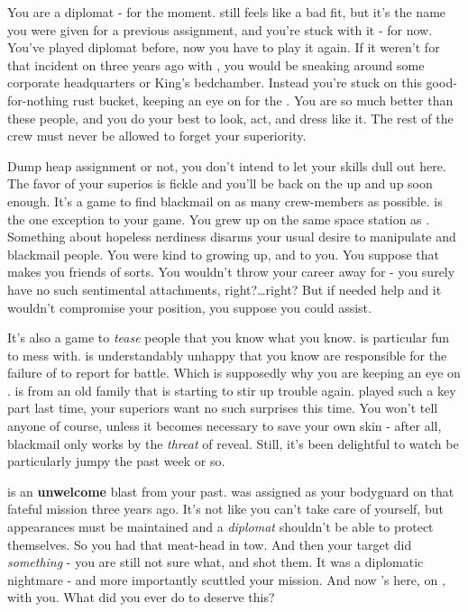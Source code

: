 \documentclass[char]{TMFHope}
\begin{document}
\name{\cDip{}}

You are a diplomat - for the moment. \cDip{} still feels like a bad fit, but it's the name you were given for a previous assignment, and you're stuck with it - for now. You've played diplomat before, now you have to play it again. If it weren't for that incident on \pHome{} three years ago with \cWeap{}, you would be sneaking around some corporate headquarters or King's bedchamber. Instead you're stuck on this good-for-nothing rust bucket, keeping an eye on \cXO{} for the \pPlan{}. You are so much better than these people, and you do your best to look, act, and dress like it. The rest of the crew must never be allowed to forget your superiority.

Dump heap assignment or not, you don't intend to let your skills dull out here. The favor of your superios is fickle and you'll be back on the up and up soon enough. It's a game to find blackmail on as many crew-members as possible. \cMed{} is the one exception to your game. You grew up on the same space station as \cMed{\them}. Something about  hopeless nerdiness disarms your usual desire to manipulate and blackmail people. You were kind to \cMed{\them} growing up, and \cMed{\they} to you. You suppose that makes you friends of sorts. You wouldn't throw your career away for \cMed{\them} - you surely have no such sentimental attachments, right?\ldots right? But if \cMed{} needed help and it wouldn't compromise your position, you suppose you could assist.

It's also a game to \emph{tease} people that you know what you know. \cXO{} is particular fun to mess with. \cXO{\They} is understandably unhappy that you know \cXO{\they} are responsible for the failure of \pOld{} to report for battle. Which is supposedly why you are keeping an eye on \cXO{\them}. \cXO{} is from an old \pEdge{} family that is starting to stir up trouble again. \cXO{\They} played such a key part last time, your superiors want no such surprises this time. You won't tell anyone of course, unless it becomes necessary to save your own skin - after all, blackmail only works by the \emph{threat} of reveal. Still, it's been delightful to watch \cXO{} be particularly jumpy the past week or so. 

\cWeap{} is an {\bf unwelcome} blast from your past. \cWeap{} was assigned as your bodyguard on that fateful mission three years ago. It's not like you can't take care of yourself, but appearances must be maintained and a \emph{diplomat} shouldn't be able to protect themselves. So you had that meat-head in tow. And then your target did \emph{something} - you are still not sure what, and \cWeap{} shot them. It was a diplomatic nightmare - and more importantly scuttled your mission. And now \cWeap{\they}'s here, on \pNew{}, with you. What did you ever do to deserve this?
\end{document}
